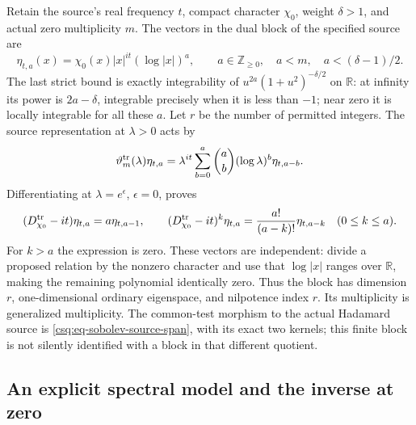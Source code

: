 Retain the source's real frequency $t$, compact character $\chi_0$,
weight $\delta>1$, and actual zero multiplicity $m$.
The vectors in the dual block of the specified source are
\[
 \eta_{t,a}(x)=\chi_0(x)|x|^{it}(\log|x|)^a,\qquad
 a\in\mathbb Z_{\geq0},\quad a<m,\quad a<(\delta-1)/2 .
\]
The last strict bound is exactly integrability of
$u^{2a}(1+u^2)^{-\delta/2}$ on $\mathbb R$: at infinity
its power is $2a-\delta$, integrable precisely when it is
less than $-1$; near zero it is locally integrable for all
these $a$. Let $r$ be the number of permitted integers.
The source representation at $\lambda>0$ acts by
\[
 \vartheta_m^{\rm tr}(\lambda)\eta_{t,a}
 =\lambda^{it}\sum_{b=0}^a\binom ab(\log\lambda)^b\eta_{t,a-b}.
\]
Differentiating at $\lambda=e^\epsilon$, $\epsilon=0$, proves
\begin{equation}
 (D_{\chi_0}^{\rm tr}-it)\eta_{t,a}=a\eta_{t,a-1},\qquad
 (D_{\chi_0}^{\rm tr}-it)^k\eta_{t,a}
 =\frac{a!}{(a-k)!}\eta_{t,a-k}\quad(0\leq k\leq a).
 \label{csq:eq-source-Sobolev-Jordan-block}
\end{equation}
For $k>a$ the expression is zero. These vectors are independent:
divide a proposed relation by the nonzero character and use
that $\log|x|$ ranges over $\mathbb R$, making the remaining
polynomial identically zero. Thus the block has dimension
$r$, one-dimensional ordinary eigenspace, and nilpotence
index $r$. Its multiplicity is generalized multiplicity.
The common-test morphism to the actual Hadamard source is
\eqref{csq:eq-sobolev-source-span}, with its exact two kernels; this finite
block is not silently identified with a block in that
different quotient.

\subsection{An explicit spectral model and the inverse at zero}


